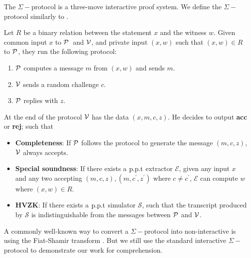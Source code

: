 The $\Sigma-$protocol is a three-move interactive proof system. We define the $\Sigma-$protocol similarly to \cite{damgard10}.
\begin{definition}
\label{sec:sigma}
Let $R$ be a binary relation between the statement $x$ and the witness $w$. Given common input $x$ to $\mathcal{P}$\ and $\mathcal{V}$, and private input $(x,w)$ such that $(x,w)\in{R}$ to $\mathcal{P}$, they run the following protocol:
\begin{enumerate}
    \item $\mathcal{P}$ computes a message $m$ from $(x,w)$ and sends $m$.
    \item $\mathcal{V}$ sends a random challenge $c$.
    \item $\mathcal{P}$ replies with $z$.
\end{enumerate}
At the end of the protocol $\mathcal{V}$ has the data $(x,m,c,z)$. He decides to output \textbf{acc} or \textbf{rej}; such that
\begin{itemize}
    \item \textbf{Completeness}: If $\mathcal{P}$ follows the protocol to generate the message $(m,c,z)$, $\mathcal{V}$ always accepts.
    \item \textbf{Special soundness}: If there exists a $\text{p.p.t}$ extractor $\mathcal{E}$, given any input $x$ and any two accepting $(m,c,z),(m,c^\prime,z^\prime)$ where $c\ne{c^\prime}$, $\mathcal{E}$ can compute $w$ where $(x,w)\in{R}$.
    \item \textbf{HVZK}: If there exists a $\text{p.p.t}$ simulator $\mathcal{S}$, such that the transcript produced by $\mathcal{S}$ is indistinguishable from the messages between $\mathcal{P}$ and $\mathcal{V}$.
\end{itemize}
\end{definition}
A commonly well-known way to convert a $\Sigma-$protocol into non-interactive is using the Fiat-Shamir transform \cite{fs}. But we still use the standard interactive $\Sigma-$protocol to demonstrate our work for comprehension.

